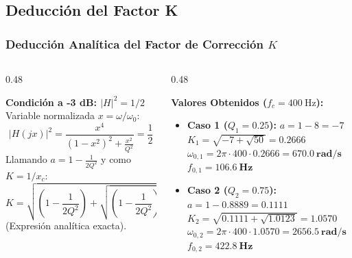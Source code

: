 \subsection{Deducción del Factor K}
\begin{frame}
  \frametitle{Deducción Analítica del Factor de Corrección $K$}

  \begin{columns}[t, onlytextwidth]
    \begin{column}{0.48\textwidth}
      \begin{tarjeta}
        {\fontsize{9pt}{11pt}\selectfont \textbf{\color{NavyDark} Condición a -3 dB: $|H|^2 = 1/2$}}\\[2pt]
        {\fontsize{8pt}{10pt}\selectfont
        Variable normalizada $x = \omega / \omega_0$:
        \[ |H(jx)|^2 = \frac{x^4}{(1 - x^2)^2 + \frac{x^2}{Q^2}} = \frac{1}{2} \]
        Llamando $a = 1 - \frac{1}{2Q^2}$ y como $K = 1/x_c$:
        \[ K = \sqrt{\left(1 - \frac{1}{2Q^2}\right) + \sqrt{\left(1 - \frac{1}{2Q^2}\right)^2 + 1}} \]
        (Expresión analítica exacta).
        }
      \end{tarjeta}
    \end{column}

    \begin{column}{0.48\textwidth}
      \begin{tarjeta}[colframe=NavyDark]
        {\fontsize{9pt}{11pt}\selectfont \textbf{\color{NavyDark} Valores Obtenidos ($f_c = \qty{400}{\hertz}$):}}\\[2pt]
        {\fontsize{8pt}{10pt}\selectfont
        \begin{itemize}\setlength{\itemsep}{3pt}
          \item \textbf{Caso 1 ($Q_1 = 0.25$):}
          $a = 1 - 8 = -7$\\
          $K_1 = \sqrt{-7 + \sqrt{50}} = \mathbf{0.2666}$\\
          $\omega_{0,1} = 2\pi \cdot 400 \cdot 0.2666 = \mathbf{\qty{670.0}{\radian\per\second}}$\\
          $f_{0,1} = \mathbf{\qty{106.6}{\hertz}}$
          \item \textbf{Caso 2 ($Q_2 = 0.75$):}
          $a = 1 - 0.8889 = 0.1111$\\
          $K_2 = \sqrt{0.1111 + \sqrt{1.0123}} = \mathbf{1.0570}$\\
          $\omega_{0,2} = 2\pi \cdot 400 \cdot 1.0570 = \mathbf{\qty{2656.5}{\radian\per\second}}$\\
          $f_{0,2} = \mathbf{\qty{422.8}{\hertz}}$
        \end{itemize}
        }
      \end{tarjeta}
    \end{column}
  \end{columns}
\end{frame}

